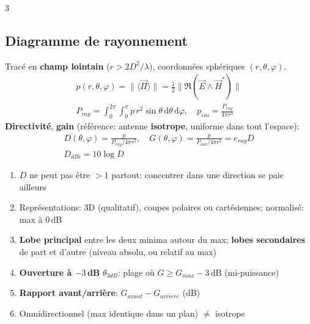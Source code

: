 \documentclass[12pt, a4paper]{article}
\newcommand{\dd}{\mathrm{d}}
\newcommand{\ve}[1]{\vec{#1}}
\begin{document}
\begin{multicols*}{3}
	\colbreak
	\subsection{Diagramme de rayonnement}
	Tracé en \textbf{champ lointain} ($r>2D^2/\lambda$), coordonnées sphériques $(r,\theta,\varphi)$.
	\begin{gather*}
		p(r,\theta,\varphi)=\|\langle\ve\Pi\rangle\|=\tfrac12\|\Re(\ve E\wedge\ve H^*)\|\\
		P_{ray}=\int_0^{2\pi}\!\!\int_0^\pi p\,r^2\sin\theta\,\dd\theta\,\dd\varphi,\quad p_{iso}=\frac{P_{ray}}{4\pi r^2}
	\end{gather*}
	\textbf{Directivité}, \textbf{gain} (référence: antenne \textbf{isotrope}, uniforme dans tout l'espace):
	\begin{gather*}
		D(\theta,\varphi)=\frac{p}{P_{ray}/4\pi r^2},\quad G(\theta,\varphi)=\frac{p}{P_{ant}/4\pi r^2}=e_{ray}D\\
		D_{dBi}=10\log D
	\end{gather*}
	\begin{enumerate}[\roman*.]
		\item $D$ ne peut pas être $>1$ partout: concentrer dans une direction se paie ailleurs
		\item Représentations: 3D (qualitatif), coupes polaires ou cartésiennes; normalisé: max à 0\,dB
		\item \textbf{Lobe principal} entre les deux minima autour du max; \textbf{lobes secondaires} de part et d'autre (niveau absolu, ou relatif au max)
		\item \textbf{Ouverture à $-3$\,dB} $\theta_{3dB}$: plage où $G\geq G_{max}-3$\,dB (mi-puissance)
		\item \textbf{Rapport avant/arrière}: $G_{avant}-G_{arri\grave ere}$ (dB)
		\item Omnidirectionnel (max identique dans un plan) $\neq$ isotrope
	\end{enumerate}

	\colbreak

\end{multicols*}
\end{document}
